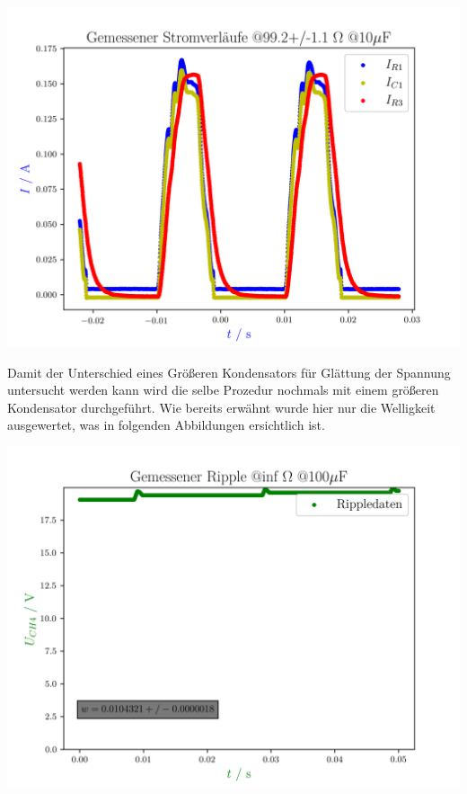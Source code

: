 \documentclass[11pt,ngerman]{scrartcl}
\begin{document}
\begin{center}
	\begin{minipage}[t]{0.8\textwidth}
		\includegraphics[width=\textwidth]{./figures/halbleiter/Versuch3/strom99.2.png}
		\label{fig:strom100}
	\end{minipage}
\end{center}

Damit der Unterschied eines Größeren Kondensators für Glättung der Spannung untersucht werden kann wird die selbe Prozedur nochmals mit einem größeren Kondensator durchgeführt.
Wie bereits erwähnt wurde hier nur die Welligkeit ausgewertet, was in folgenden
Abbildungen ersichtlich ist.


\begin{center}
	\begin{minipage}[t]{0.8\textwidth}
		\includegraphics[width=\textwidth]{./figures/halbleiter/Versuch3/spannung_ripple_inf.png}
		\label{fig:spannung_ripple_inf}
	\end{minipage}
\end{center}
\end{document}
